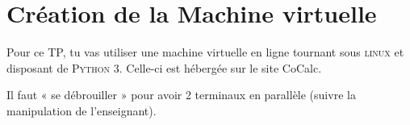 \documentclass[a4paper,12pt,french]{book}
\begin{document}



\section*{Création de la Machine virtuelle}

Pour ce TP, tu vas utiliser une machine virtuelle en ligne tournant sous \textsc{linux} et disposant de \textsc{Python 3}. Celle-ci est hébergée sur le site CoCalc.\\



Il faut « se débrouiller » pour avoir 2 terminaux en parallèle (suivre la manipulation de l'enseignant).
\end{document}
